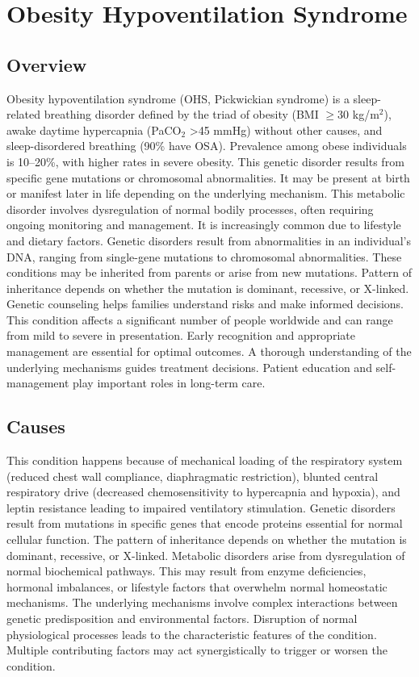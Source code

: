 \chapter{Obesity Hypoventilation Syndrome}
\label{sec:Obesity Hypoventilation Syndrome}

\section{Overview}
Obesity hypoventilation syndrome (OHS, Pickwickian syndrome) is a sleep-related breathing disorder defined by the triad of obesity (BMI $\ge$30 kg/m$^2$), awake daytime hypercapnia (PaCO$_2$ >45 mmHg) without other causes, and sleep-disordered breathing (90\% have OSA). Prevalence among obese individuals is 10--20\%, with higher rates in severe obesity. This genetic disorder results from specific gene mutations or chromosomal abnormalities. It may be present at birth or manifest later in life depending on the underlying mechanism. This metabolic disorder involves dysregulation of normal bodily processes, often requiring ongoing monitoring and management. It is increasingly common due to lifestyle and dietary factors. Genetic disorders result from abnormalities in an individual's DNA, ranging from single-gene mutations to chromosomal abnormalities. These conditions may be inherited from parents or arise from new mutations. Pattern of inheritance depends on whether the mutation is dominant, recessive, or X-linked. Genetic counseling helps families understand risks and make informed decisions. This condition affects a significant number of people worldwide and can range from mild to severe in presentation. Early recognition and appropriate management are essential for optimal outcomes. A thorough understanding of the underlying mechanisms guides treatment decisions. Patient education and self-management play important roles in long-term care.
\section{Causes}
This condition happens because of mechanical loading of the respiratory system (reduced chest wall compliance, diaphragmatic restriction), blunted central respiratory drive (decreased chemosensitivity to hypercapnia and hypoxia), and leptin resistance leading to impaired ventilatory stimulation. Genetic disorders result from mutations in specific genes that encode proteins essential for normal cellular function. The pattern of inheritance depends on whether the mutation is dominant, recessive, or X-linked. Metabolic disorders arise from dysregulation of normal biochemical pathways. This may result from enzyme deficiencies, hormonal imbalances, or lifestyle factors that overwhelm normal homeostatic mechanisms. The underlying mechanisms involve complex interactions between genetic predisposition and environmental factors. Disruption of normal physiological processes leads to the characteristic features of the condition. Multiple contributing factors may act synergistically to trigger or worsen the condition.

